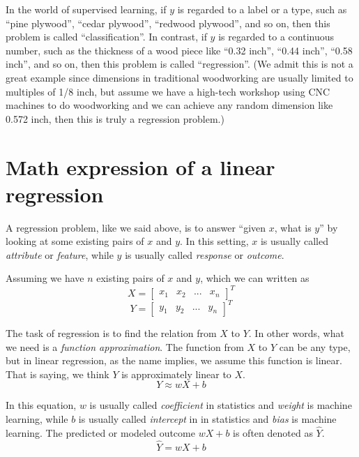 \documentclass[
	letterpaper
]{article}
\begin{document}
In the world of supervised learning, if $y$ is regarded to a label or a type, such as ``pine plywood'', ``cedar plywood'', ``redwood plywood'', and so on, then this problem is called ``classification''.
In contrast, if $y$ is regarded to a continuous number, such as the thickness of a wood piece like ``0.32 inch'', ``0.44 inch'', ``0.58 inch'', and so on, then this problem is called ``regression''. (We admit this is not a great example since dimensions in traditional woodworking are usually limited to multiples of 1/8 inch, but assume we have a high-tech workshop using CNC machines to do woodworking and we can achieve any random dimension like 0.572 inch, then this is truly a regression problem.)

\section{Math expression of a linear regression}
A regression problem, like we said above, is to answer ``given $x$, what is $y$'' by looking at some existing pairs of $x$ and $y$.
In this setting, $x$ is usually called \textit{attribute} or \textit{feature}, while $y$ is usually called \textit{response} or \textit{outcome}.

Assuming we have $n$ existing pairs of $x$ and $y$, which we can written as 
\begin{equation}
X = \begin{bmatrix}
x_1 & x_2 & ... & x_n
\end{bmatrix}^T
\end{equation}
\begin{equation}
Y = \begin{bmatrix}
y_1 & y_2 & ... & y_n
\end{bmatrix}^T
\end{equation}

The task of regression is to find the relation from $X$ to $Y$.
In other words, what we need is a \textit{function approximation}.
The function from $X$ to $Y$ can be any type, but in linear regression, as the name implies, we assume this function is linear.
That is saying, we think $Y$ is approximately linear to $X$.
\begin{equation}
Y \approx wX+b
\end{equation}

In this equation, $w$ is usually called \textit{coefficient} in statistics and \textit{weight} is machine learning, while $b$ is usually called \textit{intercept} in in statistics and \textit{bias} is machine learning.
The predicted or modeled outcome $wX+b$ is often denoted as $\hat Y$.
\begin{equation}
\hat Y = wX+b
\end{equation}
\end{document}
